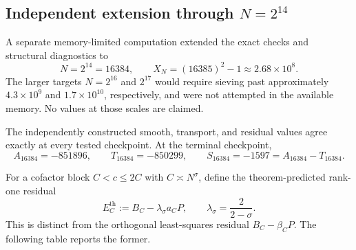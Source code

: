 \documentclass[11pt]{article}
\theoremstyle{definition}
\theoremstyle{remark}
\newcommand{\1}{\mathbf{1}}
\begin{document}
\subsection{Independent extension through $N=2^{14}$}
\label{subsec:numerics-16384}

A separate memory-limited computation extended the exact checks and structural
diagnostics to
\begin{equation}
 N=2^{14}=16384,
 \qquad
 X_N=(16385)^2-1\approx2.68\times10^8.
 \label{eq:extended-range-16384}
\end{equation}
The larger targets $N=2^{16}$ and $2^{17}$ would require sieving past
approximately $4.3\times10^9$ and $1.7\times10^{10}$, respectively, and were not
attempted in the available memory.  No values at those scales are claimed.

The independently constructed smooth, transport, and residual values agree
exactly at every tested checkpoint.  At the terminal checkpoint,
\begin{equation}
 \boxed{
 A_{16384}=-851896,
 \qquad
 T_{16384}=-850299,
 \qquad
 S_{16384}=-1597=A_{16384}-T_{16384}.
 }
 \label{eq:extended-terminal-identity}
\end{equation}

For a cofactor block $C<c\le2C$ with $C\asymp N^\sigma$, define the
theorem-predicted rank-one residual
\begin{equation}
 E_C^{\mathrm{th}}
 :=B_C-\lambda_\sigma a_C P,
 \qquad
 \lambda_\sigma=\frac{2}{2-\sigma}.
 \label{eq:theorem-predicted-residual}
\end{equation}
This is distinct from the orthogonal least-squares residual
$B_C-\widehat\beta_CP$.  The following table reports the former.
\end{document}
